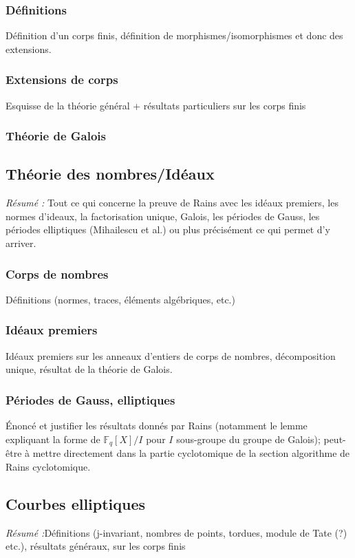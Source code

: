 \documentclass[a4paper]{article} %
\numberwithin{equation}{section}
\newcommand\GF[1]{\mathbb{F}_{#1}}
\begin{document}
\subsubsection{Définitions}
Définition d'un corps finis, définition de morphismes/isomorphismes et donc des
extensions.
\subsubsection{Extensions de corps}
Esquisse de la théorie général + résultats particuliers sur les corps finis
\subsubsection{Théorie de Galois}

\subsection{Théorie des nombres/Idéaux}
\textit{Résumé :} Tout ce qui concerne la preuve de Rains avec les idéaux 
premiers, les normes d'ideaux, la factorisation unique, Galois, les périodes de 
Gauss, les périodes elliptiques (Mihailescu et al.) ou plus précisément ce qui 
permet d'y arriver.
\subsubsection{Corps de nombres}
Définitions (normes, traces, éléments algébriques, etc.)
\subsubsection{Idéaux premiers}
 Idéaux premiers sur les anneaux d'entiers de corps de nombres,
 décomposition unique, résultat de la théorie de Galois.
\subsubsection{Périodes de Gauss, elliptiques}
Énoncé et justifier les résultats donnés par Rains (notamment le lemme
expliquant la forme de $\GF{q}[X]/I$ pour $I$ sous-groupe du groupe de Galois);
peut-être à mettre directement dans la partie cyclotomique de la section
algorithme de Rains cyclotomique.

\subsection{Courbes elliptiques}
\textit{Résumé :}Définitions (j-invariant, nombres de points, tordues, module de
Tate (?) etc.), résultats généraux, sur les corps finis
\end{document}
